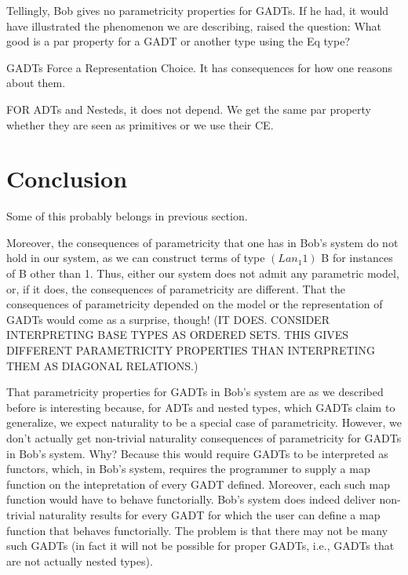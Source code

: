 \documentclass[acmsmall,screen,review,anonymous]{acmart}
\theoremstyle{definition}
\begin{document}
Tellingly, Bob gives no parametricity properties for GADTs. If he had,
it would have illustrated the phenomenon we are describing, raised the
question: What good is a par property for a GADT or another type using
the Eq type?

GADTs Force a Representation Choice. It has consequences for how one
reasons about them.

FOR ADTs and Nesteds, it does not depend. We get the same par property
whether they are seen as primitives or we use their CE.

\section{Conclusion}

{\color{blue} Some of this probably belongs in previous section.}

Moreover, the consequences of parametricity that one has in Bob's
system do not hold in our system, as we can construct terms of type
$(Lan_1 1)$ B for instances of B other than 1.  Thus, either our
system does not admit any parametric model, or, if it does, the
consequences of parametricity are different.  That the consequences of
parametricity depended on the model or the representation of GADTs
would come as a surprise, though!  (IT DOES. CONSIDER INTERPRETING
BASE TYPES AS ORDERED SETS. THIS GIVES DIFFERENT PARAMETRICITY
PROPERTIES THAN INTERPRETING THEM AS DIAGONAL RELATIONS.)

That parametricity properties for GADTs in Bob's system are as we
described before is interesting because, for ADTs and nested types,
which GADTs claim to generalize, we expect naturality to be a special
case of parametricity. However, we don't actually get non-trivial
naturality consequences of parametricity for GADTs in Bob's
system. Why? Because this would require GADTs to be interpreted as
functors, which, in Bob's system, requires the programmer to supply a
map function on the intepretation of every GADT defined. Moreover,
each such map function would have to behave functorially. Bob's system
does indeed deliver non-trivial naturality results for every GADT for
which the user can define a map function that behaves
functorially. The problem is that there may not be many such GADTs (in
fact it will not be possible for proper GADTs, i.e., GADTs that are
not actually nested types).
\end{document}
